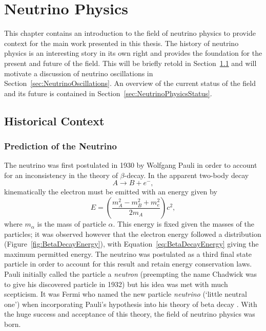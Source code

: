 
\graphicspath{{NeutrinoPhysics/Figs/}}

\chapter{Neutrino Physics}\label{chap:NeutrinoPhysics}

This chapter contains an introduction to the field of neutrino physics to provide context for the main work presented in this thesis.  The history of neutrino physics is an interesting story in its own right and provides the foundation for the present and future of the field.  This will be briefly retold in Section~\ref{sec:HistoricalContext} and will motivate a discussion of neutrino oscillations in Section~\ref{sec:NeutrinoOscillations}.  An overview of the current status of the field and its future is contained in Section~\ref{sec:NeutrinoPhysicsStatus}.

\section{Historical Context}\label{sec:HistoricalContext}

\subsection{Prediction of the Neutrino}\label{NeutrinoPrediction}

The neutrino was first postulated in 1930 by Wolfgang Pauli \cite{Pauli1930} in order to account for an inconsistency in the theory of $\beta$-decay.  In the apparent two-body decay
\begin{equation}
A \rightarrow B + e^-,
\end{equation}
kinematically the electron must be emitted with an energy given by
\begin{equation}\label{eq:BetaDecayEnergy}
E = \left( \frac{m_A^2 - m_B^2 + m_e^2}{2m_A} \right) c^2,
\end{equation}
where $m_{\alpha}$ is the mass of particle $\alpha$.  This energy is fixed given the masses of the particles; it was observed however that the electron energy followed a distribution (Figure~\ref{fig:BetaDecayEnergy}), with Equation~\ref{eq:BetaDecayEnergy} giving the maximum permitted energy.  The neutrino was postulated as a third final state particle in order to account for this result and retain energy conservation laws.  Pauli initially called the particle a \textit{neutron} (preempting the name Chadwick was to give his discovered particle in 1932) but his idea was met with much scepticism.  It was Fermi who named the new particle \textit{neutrino} (`little neutral one') when incorporating Pauli's hypothesis into his theory of beta decay \cite{Fermi1934Italian,Fermi1934German,Wilson1968}.  With the huge success and acceptance of this theory, the field of neutrino physics was born.

